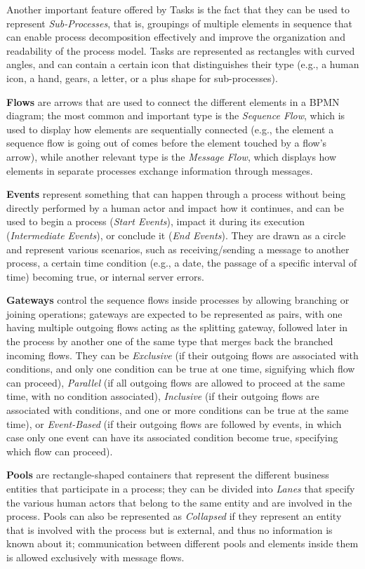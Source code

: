 Another important feature offered by Tasks is the fact that they can be used to represent \emph{Sub-Processes}, that is, groupings of multiple elements in sequence that can enable process decomposition effectively and improve the organization and readability of the process model. Tasks are represented as rectangles with curved angles, and can contain a certain icon that distinguishes their type (e.g., a human icon, a hand, gears, a letter, or a plus shape for sub-processes).

\textbf{Flows} are arrows that are used to connect the different elements in a BPMN diagram; the most common and important type is the \emph{Sequence Flow}, which is used to display how elements are sequentially connected (e.g., the element a sequence flow is going out of comes before the element touched by a flow's arrow), while another relevant type is the \emph{Message Flow}, which displays how elements in separate processes exchange information through messages.

\textbf{Events} represent something that can happen through a process without being directly performed by a human actor and impact how it continues, and can be used to begin a process (\emph{Start Events}), impact it during its execution (\emph{Intermediate Events}), or conclude it (\emph{End Events}). They are drawn as a circle and represent various scenarios, such as receiving/sending a message to another process, a certain time condition (e.g., a date, the passage of a specific interval of time) becoming true, or internal server errors.

\textbf{Gateways} control the sequence flows inside processes by allowing branching or joining operations; gateways are expected to be represented as pairs, with one having multiple outgoing flows acting as the splitting gateway, followed later in the process by another one of the same type that merges back the branched incoming flows. They can be \emph{Exclusive} (if their outgoing flows are associated with conditions, and only one condition can be true at one time, signifying which flow can proceed), \emph{Parallel} (if all outgoing flows are allowed to proceed at the same time, with no condition associated), \emph{Inclusive} (if their outgoing flows are associated with conditions, and one or more conditions can be true at the same time), or \emph{Event-Based} (if their outgoing flows are followed by events, in which case only one event can have its associated condition become true, specifying which flow can proceed).

\textbf{Pools} are rectangle-shaped containers that represent the different business entities that participate in a process; they can be divided into \emph{Lanes} that specify the various human actors that belong to the same entity and are involved in the process. Pools can also be represented as \emph{Collapsed} if they represent an entity that is involved with the process but is external, and thus no information is known about it; communication between different pools and elements inside them is allowed exclusively with message flows.

